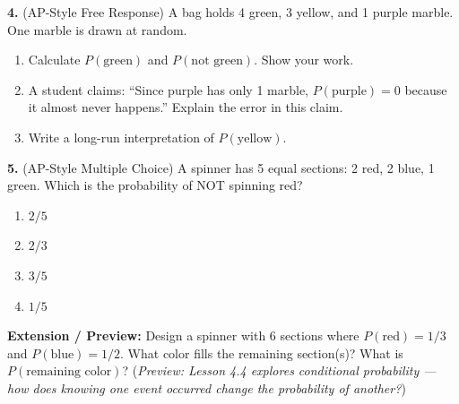 \documentclass[10pt]{article}
\begin{document}
\begin{practicebox}
\vspace{8pt}
\textbf{4.} (AP-Style Free Response) A bag holds 4 green, 3 yellow, and 1 purple
marble. One marble is drawn at random.

\begin{enumerate}[label=(\alph*), leftmargin=2em, itemsep=8pt]
  \item Calculate $P(\text{green})$ and $P(\text{not green})$. Show your work.
        \vspace{16pt}
  \item A student claims: ``Since purple has only 1 marble, $P(\text{purple}) = 0$
        because it almost never happens.'' Explain the error in this claim.\\
        \writeline\writeline
  \item Write a long-run interpretation of $P(\text{yellow})$.\\
        \writeline\writeline
\end{enumerate}

\vspace{8pt}
\textbf{5.} (AP-Style Multiple Choice) A spinner has 5 equal sections: 2 red,
2 blue, 1 green. Which is the probability of NOT spinning red?

\begin{enumerate}[label=(\Alph*), leftmargin=2em, itemsep=4pt]
  \item $2/5$
  \item $2/3$
  \item $3/5$
  \item $1/5$
\end{enumerate}

\vspace{8pt}
\textbf{Extension / Preview:} Design a spinner with 6 sections where
$P(\text{red}) = 1/3$ and $P(\text{blue}) = 1/2$. What color fills the remaining
section(s)? What is $P(\text{remaining color})$? (\textit{Preview: Lesson 4.4 explores
conditional probability --- how does knowing one event occurred change the probability
of another?})

\end{practicebox}
\end{document}
